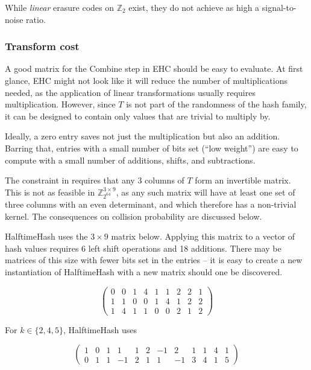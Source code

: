 \documentclass[sigconf, nonacm]{acmart}
\newcommand{\ints}{\mathbb{Z}}
\begin{document}
While {\em linear} erasure codes on $\ints_2$ exist, they do not achieve as high a signal-to-noise ratio.

\subsubsection{Transform cost}

A good matrix for the Combine step in EHC should be easy to evaluate.
At first glance, EHC might not look like it will reduce the number of multiplications needed, as the application of linear transformations usually requires multiplication.
However, since $T$ is not part of the randomness of the hash family, it can be designed to contain only values that are trivial to multiply by.

Ideally, a zero entry saves not just the multiplication but also an addition.
Barring that, entries with a small number of bits set (``low weight'') are easy to compute with a small number of additions, shifts, and subtractions.

The constraint in \cite{ehc-nandi} requires that any 3 columns of $T$ form an invertible matrix.
This is not as feasible in $\ints_{2^{64}}^{3 \times 9}$, as any such matrix will have at least one set of three columns with an even determinant, and which therefore has a non-trivial kernel.
The consequences on collision probability are discussed below.

HalftimeHash uses the $3 \times 9$ matrix below.
Applying this matrix to a vector of hash values requires 6 left shift operations and 18 additions.
There may be matrices of this size with fewer bits set in the entries -- it is easy to create a new instantiation of HalftimeHash with a new matrix should one be discovered.

\begin{displaymath}
  \left(
\begin{array}{rrrrrrrrr}
  0 & 0 & 1 & 4 & 1 & 1 & 2 & 2 & 1\\
  1 & 1 & 0 & 0 & 1 & 4 & 1 & 2 & 2\\
  1 & 4 & 1 & 1 & 0 & 0 & 2 & 1 & 2
\end{array}
\right)
\end{displaymath}

For $k \in \{2, 4, 5\}$, HalftimeHash uses

\[
\left(
\begin{array}{rrrrrrrrrrrr}
  1 & 0 & 1 & 1 & 1 & 2 & -1 & 2 & 1 & 1 & 4 & 1\\
  0 & 1 & 1 & -1 & 2 & 1 & 1 & -1 & 3 & 4 & 1 & 5
\end{array}
\right)
\]
\end{document}
